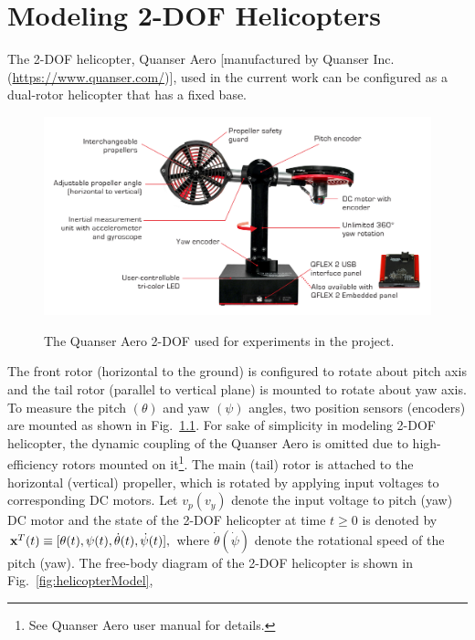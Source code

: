 \chapter{Modeling 2-DOF Helicopters}
\label{ch: Chapter2}
The 2-DOF helicopter, Quanser Aero [manufactured by Quanser Inc. (\href{https://www.quanser.com/}{https://www.quanser.com/})], used in the current work can be configured as a dual-rotor helicopter that has a fixed base. 
\begin{figure}[!htbp]
    \centering
    \includegraphics[width=.75\textwidth,keepaspectratio=true]{figs/img/quanserAero.png}
    \label{fig:quanserAero}
    \caption{The Quanser Aero 2-DOF used for experiments in the project.}
\end{figure}
The front rotor (horizontal to the ground) is configured to rotate about pitch axis and the tail rotor (parallel to vertical plane) is mounted to rotate about yaw axis. To measure the pitch $(\theta)$ and yaw $(\psi)$ angles, two position sensors (encoders) are mounted as shown in Fig.~\ref{fig:quanserAero}. For sake of simplicity in modeling 2-DOF helicopter, the  dynamic coupling of the Quanser Aero is omitted due to high-efficiency rotors mounted on it\footnote{See Quanser Aero user manual for details.}. The main (tail) rotor is attached to the horizontal (vertical) propeller, which is rotated by applying input voltages to corresponding DC motors. Let $v_p(v_y)$ denote the input voltage to pitch (yaw) DC motor and the state of the 2-DOF helicopter at time $t\ge 0$ is denoted by ${\bf x}^T(t) \equiv [\theta(t),\psi(t),\dot\theta(t),\dot\psi(t)],$ where $\dot\theta(\dot\psi)$ denote the rotational speed of the pitch (yaw). The free-body diagram of the 2-DOF helicopter is shown in Fig.~\ref{fig:helicopterModel}, 

